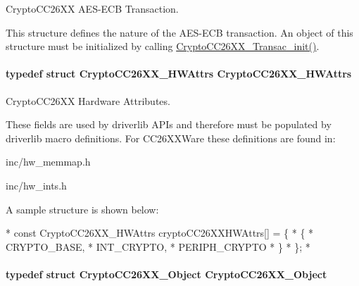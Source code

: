 Crypto\-C\-C26\-X\-X A\-E\-S-\/\-E\-C\-B Transaction. 

This structure defines the nature of the A\-E\-S-\/\-E\-C\-B transaction. An object of this structure must be initialized by calling \hyperlink{_crypto_c_c26_x_x_8h_afb3ea8faceda234cdd62c5f53e203946}{Crypto\-C\-C26\-X\-X\-\_\-\-Transac\-\_\-init()}. 
\paragraph[{Crypto\-C\-C26\-X\-X\-\_\-\-H\-W\-Attrs}]{\setlength{\rightskip}{0pt plus 5cm}typedef struct {\bf Crypto\-C\-C26\-X\-X\-\_\-\-H\-W\-Attrs}  {\bf Crypto\-C\-C26\-X\-X\-\_\-\-H\-W\-Attrs}}\label{_crypto_c_c26_x_x_8h_a43b8004f918cfc847b65ebe981970da7}


Crypto\-C\-C26\-X\-X Hardware Attributes. 

These fields are used by driverlib A\-P\-Is and therefore must be populated by driverlib macro definitions. For C\-C26\-X\-X\-Ware these definitions are found in\-:
\begin{DoxyItemize}
\item inc/hw\-\_\-memmap.\-h
\item inc/hw\-\_\-ints.\-h
\end{DoxyItemize}

A sample structure is shown below\-: 
\begin{DoxyCode}
*  \textcolor{keyword}{const} CryptoCC26XX_HWAttrs cryptoCC26XXHWAttrs[] = \{
*      \{
*          CRYPTO\_BASE,
*          INT\_CRYPTO,
*          PERIPH\_CRYPTO
*      \}
*  \};
*  
\end{DoxyCode}
\paragraph[{Crypto\-C\-C26\-X\-X\-\_\-\-Object}]{\setlength{\rightskip}{0pt plus 5cm}typedef struct {\bf Crypto\-C\-C26\-X\-X\-\_\-\-Object}  {\bf Crypto\-C\-C26\-X\-X\-\_\-\-Object}}\label{_crypto_c_c26_x_x_8h_a1d3ce506f41ca09dbb4fc02615c54d4e}


